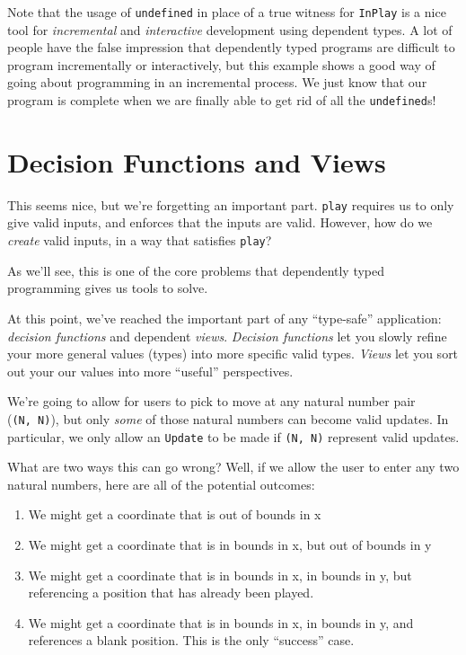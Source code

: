 \documentclass[]{article}
\begin{document}
Note that the usage of \texttt{undefined} in place of a true witness for
\texttt{InPlay} is a nice tool for \emph{incremental} and \emph{interactive}
development using dependent types. A lot of people have the false impression
that dependently typed programs are difficult to program incrementally or
interactively, but this example shows a good way of going about programming in
an incremental process. We just know that our program is complete when we are
finally able to get rid of all the \texttt{undefined}s!

\hypertarget{decision-functions-and-views}{%
\section{Decision Functions and Views}\label{decision-functions-and-views}}

This seems nice, but we're forgetting an important part. \texttt{play} requires
us to only give valid inputs, and enforces that the inputs are valid. However,
how do we \emph{create} valid inputs, in a way that satisfies \texttt{play}?

As we'll see, this is one of the core problems that dependently typed
programming gives us tools to solve.

At this point, we've reached the important part of any ``type-safe''
application: \emph{decision functions} and dependent \emph{views}.
\emph{Decision functions} let you slowly refine your more general values (types)
into more specific valid types. \emph{Views} let you sort out your our values
into more ``useful'' perspectives.

We're going to allow for users to pick to move at any natural number pair
(\texttt{(N,\ N)}), but only \emph{some} of those natural numbers can become
valid updates. In particular, we only allow an \texttt{Update} to be made if
\texttt{(N,\ N)} represent valid updates.

What are two ways this can go wrong? Well, if we allow the user to enter any two
natural numbers, here are all of the potential outcomes:

\begin{enumerate}
\def\labelenumi{\arabic{enumi}.}
\tightlist
\item
  We might get a coordinate that is out of bounds in x
\item
  We might get a coordinate that is in bounds in x, but out of bounds in y
\item
  We might get a coordinate that is in bounds in x, in bounds in y, but
  referencing a position that has already been played.
\item
  We might get a coordinate that is in bounds in x, in bounds in y, and
  references a blank position. This is the only ``success'' case.
\end{enumerate}
\end{document}

